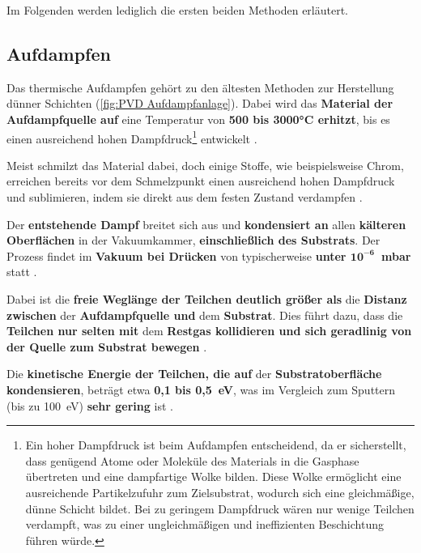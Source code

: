 \documentclass{article} %
\begin{document}
Im Folgenden werden lediglich die ersten beiden Methoden erläutert.

\vspace{1em}
\subsection{Aufdampfen} %
Das thermische Aufdampfen gehört zu den ältesten Methoden zur Herstellung dünner Schichten (\autoref{fig:PVD Aufdampfanlage}). Dabei wird das 
\textbf{Material der Aufdampfquelle auf} eine Temperatur von \textbf{500 bis 3000°C erhitzt}, bis es einen ausreichend hohen 
Dampfdruck\footnote{Ein hoher Dampfdruck ist beim Aufdampfen entscheidend, da er sicherstellt, dass genügend Atome oder Moleküle des Materials 
in die Gasphase übertreten und eine dampfartige Wolke bilden. Diese Wolke ermöglicht eine ausreichende Partikelzufuhr zum Zielsubstrat, wodurch 
sich eine gleichmäßige, dünne Schicht bildet. Bei zu geringem Dampfdruck wären nur wenige Teilchen verdampft, was zu einer ungleichmäßigen und 
ineffizienten Beschichtung führen würde.} entwickelt \cite{keplinger2024}.

\vspace{1em}

Meist schmilzt das Material dabei, doch einige Stoffe, wie beispielsweise Chrom, erreichen bereits vor dem Schmelzpunkt einen ausreichend hohen 
Dampfdruck und sublimieren, indem sie direkt aus dem festen Zustand verdampfen \cite{keplinger2024}.

\vspace{1em}

Der \textbf{entstehende Dampf} breitet sich aus und \textbf{kondensiert an} allen \textbf{kälteren Oberflächen} in der Vakuumkammer, 
\textbf{einschließlich des Substrats}. Der Prozess findet im \textbf{Vakuum bei Drücken} von typischerweise 
\textbf{unter $\mathbf{10^{-6}}$~mbar} statt \cite{keplinger2024}.

\vspace{1em}

Dabei ist die \textbf{freie Weglänge der Teilchen deutlich größer als} die \textbf{Distanz zwischen} der \textbf{Aufdampfquelle und} dem 
\textbf{Substrat}. Dies führt dazu, dass die \textbf{Teilchen nur selten mit} dem \textbf{Restgas kollidieren und sich geradlinig von der Quelle 
zum Substrat bewegen} \cite{keplinger2024}.

\vspace{1em}

Die \textbf{kinetische Energie der Teilchen, die auf} der \textbf{Substratoberfläche kondensieren}, beträgt etwa \textbf{0,1 bis 0,5~eV}, was im 
Vergleich zum Sputtern (bis zu 100~eV) \textbf{sehr gering} ist \cite{keplinger2024}.
\end{document}
